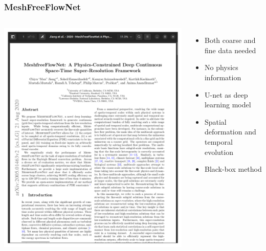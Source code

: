 \documentclass{beamer}
\begin{document}
\begin{frame}
    \frametitle{MeshFreeFlowNet}
\begin{columns}
\includegraphics[scale=0.12]{figures/MeshFreeFlowNet.png}
\begin{itemize}
    \item Both coarse and fine data needed
    \item No physics information
    \item U-net as deep learning model
    \item Spatial deformation and temporal evolution
    \item Black-box method
\end{itemize}
\end{columns}
\end{frame}
\end{document}
